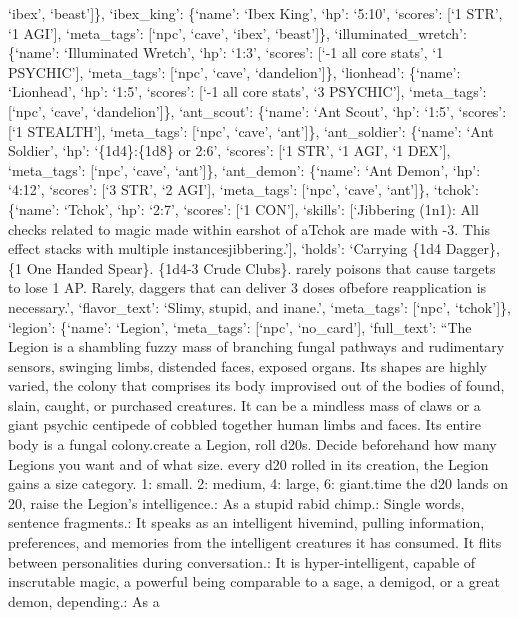 \documentclass[
  letterpaper,
  DIV=11,
  numbers=noendperiod]{scrartcl}
\begin{document}
`ibex', `beast'{]}\}, `ibex\_king': \{`name': `Ibex King', `hp': `5:10',
`scores': {[}`1 STR', `1 AGI'{]}, `meta\_tags': {[}`npc', `cave',
`ibex', `beast'{]}\}, `illuminated\_wretch': \{`name': `Illuminated
Wretch', `hp': `1:3', `scores': {[}`-1 all core stats', `1 PSYCHIC'{]},
`meta\_tags': {[}`npc', `cave', `dandelion'{]}\}, `lionhead': \{`name':
`Lionhead', `hp': `1:5', `scores': {[}`-1 all core stats', `3
PSYCHIC'{]}, `meta\_tags': {[}`npc', `cave', `dandelion'{]}\},
`ant\_scout': \{`name': `Ant Scout', `hp': `1:5', `scores': {[}`1
STEALTH'{]}, `meta\_tags': {[}`npc', `cave', `ant'{]}\}, `ant\_soldier':
\{`name': `Ant Soldier', `hp': `\{1d4\}:\{1d8\} or 2:6', `scores': {[}`1
STR', `1 AGI', `1 DEX'{]}, `meta\_tags': {[}`npc', `cave', `ant'{]}\},
`ant\_demon': \{`name': `Ant Demon', `hp': `4:12', `scores': {[}`3 STR',
`2 AGI'{]}, `meta\_tags': {[}`npc', `cave', `ant'{]}\}, `tchok':
\{`name': `Tchok', `hp': `2:7', `scores': {[}`1 CON'{]}, `skills':
{[}`Jibbering (1n1): All checks related to magic made within earshot of
a\njibbering Tchok are made with -3. This effect stacks with multiple
instances\nof jibbering.'{]}, `holds': `Carrying \{1d4 Dagger\}, \{1 One
Handed Spear\}. \{1d4-3 Crude Clubs\}. \nMore rarely poisons that cause
targets to lose 1 AP. Rarely, daggers that can deliver 3 doses
of\npoison before reapplication is necessary.', `flavor\_text': `Slimy,
stupid, and inane.', `meta\_tags': {[}`npc', `tchok'{]}\}, `legion':
\{`name': `Legion', `meta\_tags': {[}`npc', `no\_card'{]}, `full\_text':
``The Legion is a shambling fuzzy mass of branching fungal pathways and
rudimentary sensors, swinging limbs, distended faces, exposed organs.
Its shapes are highly varied, the colony that comprises its body
improvised out of the bodies of found, slain, caught, or purchased
creatures. It can be a mindless mass of claws or a giant psychic
centipede of cobbled together human limbs and faces. Its entire body is
a fungal colony.\n\nTo create a Legion, roll d20s. Decide beforehand how
many Legions you want and of what size. \n\nFor every d20 rolled in its
creation, the Legion gains a size category. 1: small. 2: medium, 4:
large, 6: giant.\n\nEvery time the d20 lands on 20, raise the Legion's
intelligence.\n{}: As a stupid rabid chimp.\n{}: Single words,
sentence fragments.\n{}: It speaks as an intelligent hivemind, pulling
information, preferences, and memories from the intelligent creatures it
has consumed. It flits between personalities during conversation.\n{}:
It is hyper-intelligent, capable of inscrutable magic, a powerful being
comparable to a sage, a demigod, or a great demon, depending.\n{}: As a
\end{document}

